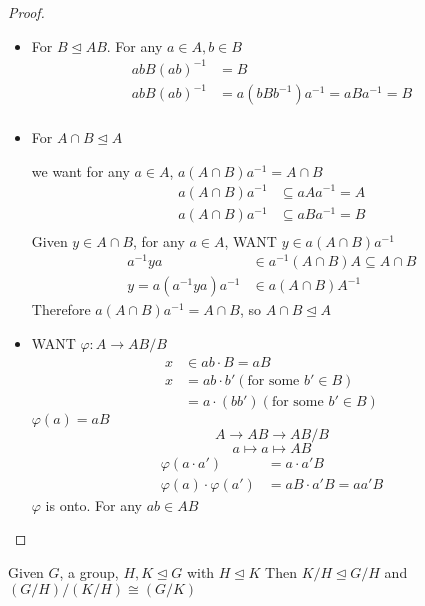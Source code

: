 \begin{proof}
  \text{ }
  \begin{itemize}
    \item 
  For $B \unlhd AB$.
  For any $a \in A, b \in B$
  \begin{align*}
    abB(ab)^{-1} &= B \\
    abB(ab)^{-1} &=a(bBb^{-1})a^{-1} = aBa^{-1} = B \\
  \end{align*}
  \item For $A \cap B \unlhd A$

  we want for any $a \in A$, $a(A \cap B) a^{-1} = A \cap B$
  \begin{align*}
    a(A \cap B) a^{-1} &\subseteq aAa^{-1} = A \\
    a(A \cap B) a^{-1} &\subseteq aBa^{-1} = B \\
  \end{align*}
  Given $y \in A \cap B$, for any $a \in A$, WANT $y \in a(A \cap B) a^{-1}$
  \begin{align*}
    a^{-1}ya &\in a^{-1}(A\cap B)A \subseteq A \cap B \\
    y = a(a^{-1}ya)a^{-1} &\in a(A \cap B)A^{-1}
  \end{align*}
  Therefore $a(A \cap B) a^{-1} = A \cap B$, so $A \cap B \unlhd A$
  \item WANT $\varphi: A \to AB/B$
  \begin{align*}
    x &\in ab \cdot B = aB \\
    x &= ab \cdot b' (\text{for some }b' \in B)\\
    &= a\cdot (bb')(\text{for some }b' \in B)
  \end{align*}
  $\varphi(a) = aB$
  \[A \to AB \to AB/B\]
  \[a \mapsto a \mapsto AB\]
  \begin{align*}
    \varphi(a \cdot a') &= a\cdot a' B \\
    \varphi(a)\cdot \varphi(a') &= aB\cdot a'B = aa'B
  \end{align*}
  $\varphi$ is onto. For any $ab \in AB$
  \end{itemize}

\end{proof}

\begin{theorem}
  Given $G$, a group, $H, K \unlhd G$ with $H \unlhd K$ Then
  $K/H \unlhd G/H$ and $(G/H)/(K/H) \cong(G/K)$
\end{theorem}